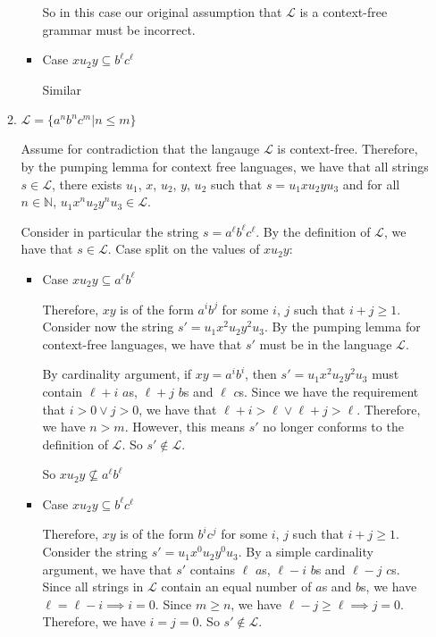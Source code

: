 \documentclass[10pt,\jkfside,a4paper]{article}
\begin{document}
\begin{enumerate}
\begin{enumerate}
\begin{itemize}
So in this case our original assumption that $\mathcal L$ is a context-free
grammar must be incorrect.

\item Case $x u_2 y \subseteq b^\ell c^\ell$

Similar

\end{itemize}

\item $\mathcal L = \{a^n b^n c^m | n \le m\}$

Assume for contradiction that the langauge $\mathcal L$ is context-free.
Therefore, by the pumping lemma for context free languages, we have that all
strings $s \in \mathcal L$, there exists $u_1$, $x$, $u_2$, $y$, $u_2$ such
that $s = u_1 x u_2 y u_3$ and for all $n \in \mathbb{N}$, $u_1 x^n u_2 y^n
u_3 \in \mathcal L$.

Consider in particular the string $s = a^\ell b^\ell c^{\ell}$. By the
definition of $\mathcal L$, we have that $s \in \mathcal L$. Case split on
the values of $x u_2 y$:

\begin{itemize}

\item Case $x u_2 y \subseteq a^\ell b^\ell$

Therefore, $xy$ is of the form $a^i b^j$ for some $i$, $j$ such that $i + j
\ge 1$. Consider now the string $s' = u_1 x^2 u_2 y^2 u_3$. By the
pumping lemma for context-free languages, we have that $s'$ must be in the
language $\mathcal L$.

By cardinality argument, if $xy = a^i b^i$, then $s' = u_1 x^2 u_2
y^2 u_3$ must contain $\ell + i$ $a$s, $\ell + j$ $b$s and $\ell$ $c$s.
Since we have the requirement that $i > 0 \vee j > 0$, we have that $\ell +
i > \ell \vee \ell + j > \ell$. Therefore, we have $n > m$. However, this
means $s'$ no longer conforms to the definition of $\mathcal L$. So $s'
\notin \mathcal L$.

So $x u_2 y \nsubseteq a^\ell b^\ell$

\item Case $x u_2 y \subseteq b^\ell c^\ell$

Therefore, $xy$ is of the form $b^i c^j$ for some $i$, $j$ such that $i + j
\ge 1$. Consider the string $s' = u_1 x^0 u_2 y^0 u_3$. By a simple
cardinality argument, we have that $s'$ contains $\ell$ $a$s, $\ell - i$
$b$s and $\ell - j$ $c$s. Since all strings in $\mathcal L$ contain an equal
number of $a$s and $b$s, we have $\ell = \ell - i \implies i = 0$. Since $m
\ge n$, we have $\ell - j \ge \ell \implies j = 0$. Therefore, we have $i =
j = 0$. So $s' \notin \mathcal L$.


\end{itemize}
\end{enumerate}
\end{enumerate}
\end{document}
